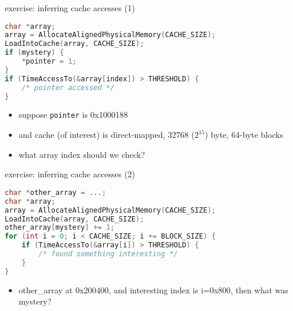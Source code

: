\begin{frame}[fragile]{exercise: inferring cache accesses (1)}
\begin{lstlisting}[language=C,style=smaller]
char *array;
array = AllocateAlignedPhysicalMemory(CACHE_SIZE);
LoadIntoCache(array, CACHE_SIZE);
if (mystery) {
    *pointer = 1;
}
if (TimeAccessTo(&array[index]) > THRESHOLD) {
    /* pointer accessed */
}
\end{lstlisting}
\begin{itemize}
\item suppose \texttt{pointer} is 0x1000188
\item and cache (of interest) is direct-mapped, 32768 ($2^{15}$) byte, 64-byte blocks
\item what array index should we check?
\end{itemize}
\end{frame}

\begin{frame}[fragile]{exercise: inferring cache accesses (2)}
\begin{lstlisting}[language=C,style=smaller]
char *other_array = ...;
char *array;
array = AllocateAlignedPhysicalMemory(CACHE_SIZE);
LoadIntoCache(array, CACHE_SIZE);
other_array[mystery] += 1;
for (int i = 0; i < CACHE_SIZE; i += BLOCK_SIZE) {
    if (TimeAccessTo(&array[i]) > THRESHOLD) {
        /* found something interesting */
    }
}
\end{lstlisting}
\begin{itemize}
\item other\_array at 0x200400, and interesting index is i=0x800,
    then what was mystery?
\end{itemize}
\end{frame}

